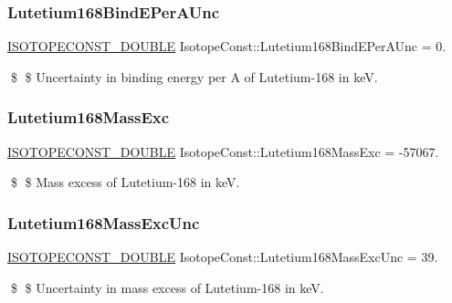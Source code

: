 \subsubsection{\texorpdfstring{Lutetium168\+Bind\+E\+Per\+A\+Unc}{Lutetium168BindEPerAUnc}}
{\footnotesize\ttfamily \mbox{\hyperlink{group___isotope_const-_macros_ga8f45a7272ce02c0b4c65c44636ed719a}{I\+S\+O\+T\+O\+P\+E\+C\+O\+N\+S\+T\+\_\+\+D\+O\+U\+B\+LE}} Isotope\+Const\+::\+Lutetium168\+Bind\+E\+Per\+A\+Unc = 0.}

\$ \$ Uncertainty in binding energy per A of Lutetium-\/168 in keV. \mbox{\label{group___isotope_const-_lutetium-_lu168_gaa906fe747af2fce5575dab88afa4908f}} 
\subsubsection{\texorpdfstring{Lutetium168\+Mass\+Exc}{Lutetium168MassExc}}
{\footnotesize\ttfamily \mbox{\hyperlink{group___isotope_const-_macros_ga8f45a7272ce02c0b4c65c44636ed719a}{I\+S\+O\+T\+O\+P\+E\+C\+O\+N\+S\+T\+\_\+\+D\+O\+U\+B\+LE}} Isotope\+Const\+::\+Lutetium168\+Mass\+Exc = -\/57067.}

\$ \$ Mass excess of Lutetium-\/168 in keV. \mbox{\label{group___isotope_const-_lutetium-_lu168_ga7862c14196b53ae9073993ed69e7f9fa}} 
\subsubsection{\texorpdfstring{Lutetium168\+Mass\+Exc\+Unc}{Lutetium168MassExcUnc}}
{\footnotesize\ttfamily \mbox{\hyperlink{group___isotope_const-_macros_ga8f45a7272ce02c0b4c65c44636ed719a}{I\+S\+O\+T\+O\+P\+E\+C\+O\+N\+S\+T\+\_\+\+D\+O\+U\+B\+LE}} Isotope\+Const\+::\+Lutetium168\+Mass\+Exc\+Unc = 39.}

\$ \$ Uncertainty in mass excess of Lutetium-\/168 in keV. \mbox{\label{group___isotope_const-_lutetium-_lu168_ga5f1dc51c47d268e8484e59ac8a64c52d}} 
